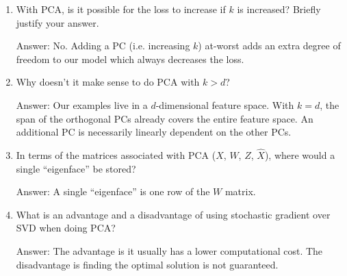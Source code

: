 \documentclass{article}
\newenvironment{answer}{\par\begingroup\color{gre}Answer: }{\endgroup}
\begin{document}
\begin{enumerate}
\item With PCA, is it possible for the loss to increase if $k$ is increased? Briefly justify your answer.
\begin{answer}
    No. Adding a PC (i.e. increasing $k$) at-worst adds an extra degree of freedom to our model which always decreases the loss.
\end{answer}

\item Why doesn't it make sense to do PCA with $k > d$?
\begin{answer}
    Our examples live in a $d$-dimensional feature space. With $k=d$, the span of the orthogonal PCs already covers the entire feature space. An additional PC is necessarily linearly dependent on the other PCs.
\end{answer}

\item In terms of the matrices associated with PCA ($X$, $W$, $Z$, $\hat{X}$), where would a single ``eigenface'' be stored?
\begin{answer}
    A single ``eigenface'' is one row of the $W$ matrix.
\end{answer}

\item What is an advantage and a disadvantage of using stochastic gradient over SVD when doing PCA?
\begin{answer}
    The advantage is it usually has a lower computational cost. The disadvantage is finding the optimal solution is not guaranteed.
\end{answer}

\end{enumerate}
\end{document}
